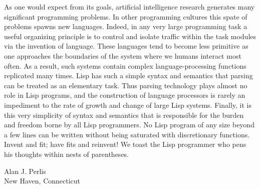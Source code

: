 As one would expect from its goals, artificial intelligence research generates
many significant programming problems.  In other programming cultures this
spate of problems spawns new languages.  Indeed, in any very large programming
task a useful organizing principle is to control and isolate traffic within the
task modules via the invention of language.  These languages tend to become
less primitive as one approaches the boundaries of the system where we humans
interact most often.  As a result, such systems contain complex
language-processing functions replicated many times.  Lisp has such a simple
syntax and semantics that parsing can be treated as an elementary task.  Thus
parsing technology plays almost no role in Lisp programs, and the construction
of language processors is rarely an impediment to the rate of growth and change
of large Lisp systems.  Finally, it is this very simplicity of syntax and
semantics that is responsible for the burden and freedom borne by all Lisp
programmers.  No Lisp program of any size beyond a few lines can be written
without being saturated with discretionary functions.  Invent and fit; have
fits and reinvent!  We toast the Lisp programmer who pens his thoughts within
nests of parentheses.

\vspace{0.5em}
\noindent
Alan J. Perlis\\
New Haven, Connecticut
